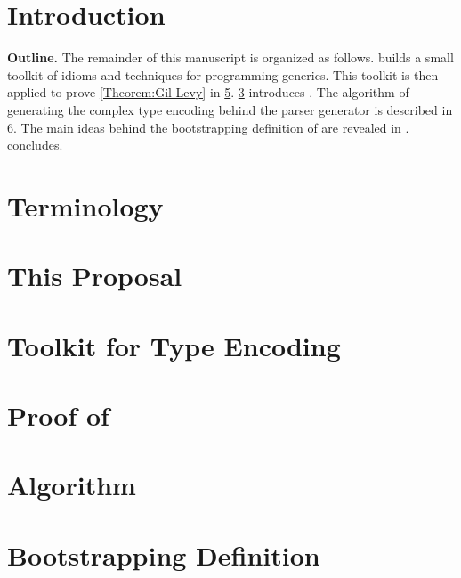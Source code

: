 \documentclass[a4paper,USenglish]{lipics}
\author{Anonymized for the submission}
\begin{document}
\maketitle
\begin{abstract}
	 
\end{abstract}



\section{Introduction}


\textbf{Outline.} 
The remainder of this manuscript is organized as follows.
 builds a small toolkit of idioms and techniques for programming generics.  
This toolkit is then applied to prove \cref{Theorem:Gil-Levy} 
  in \cref{Section:proof}.
\cref{Section:proposal} introduces \Self.
The algorithm of generating the complex type encoding behind the parser generator 
is described in \cref{Section:algorithm}. 
The main ideas behind the bootstrapping definition of \Self 
  are revealed in . 
 concludes. 

\section{Terminology}
\label{Section:terminology}
%

\section{This Proposal}
\label{Section:proposal}
%

\section{Toolkit for Type Encoding}
\label{Section:toolkit}


\section{Proof of }
\label{Section:proof}


\section{Algorithm}
\label{Section:algorithm}
%

\section{Bootstrapping Definition}
\label{Section:bootstrapping}
%
\end{document}
